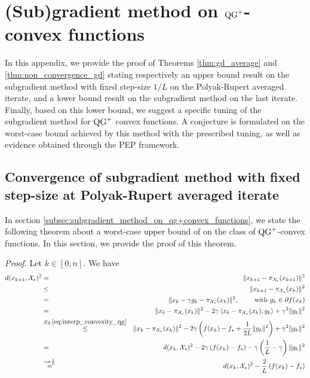 \section{\texorpdfstring{(Sub)gradient method on $\operatorname{QG}^+$-convex functions}{(Sub)-gradient method on QG+ convex functions}}
\label{apx:subgrad}

In this appendix, we provide the proof of Theorems \ref{thm:gd_average} and \ref{thm:non_convergence_gd} stating respectively an upper bound result on the subgradient method with fixed step-size $1 / L$ on the Polyak-Rupert averaged iterate, and a lower bound result on the subgradient method on the last iterate.
Finally, based on this lower bound, we suggest a specific tuning of the subgradient method for $\operatorname{QG}^+$ convex functions.
A conjecture is formulated on the worst-case bound achieved by this method with the prescribed tuning, as well as evidence obtained through the PEP framework.

\subsection{Convergence of subgradient method with fixed step-size at Polyak-Rupert averaged iterate}\label{apx:gd_proof_th1_upper_bound}

In section \ref{subsec:subgradient_method_on_qg+convex_functions}, we state the following theorem about a worst-case upper bound of  on the class of $\operatorname{QG}^+$-convex functions. In this section, we provide the proof of this theorem.

\convergenceofsubgradientmethodinaverage*

\noindent \textit{Proof.}
    Let $k \in [0, n]$. We have
    \begin{eqnarray*}
        d(x_{k+1}, \mathcal{X}_\star)^2 & = & \|x_{k+1} - \pi_{\mathcal{X}_\star}(x_{k+1})\|^2 \\
        & \leq & \|x_{k+1} - \pi_{\mathcal{X}_\star}(x_{k})\|^2 \\
        & = & \|x_k - \gamma g_k -  \pi_{\mathcal{X}_\star}(x_{k})\|^2, \qquad \text{ with } g_k \in \partial f(x_k) \\
        & = & \|x_k - \pi_{\mathcal{X}_\star}(x_{k})\|^2 - 2\gamma \left< x_k - \pi_{\mathcal{X}_\star}(x_{k}) , g_k \right> + \gamma^2 \|g_k\|^2 \\
        & \overset{Eq. \eqref{eq:interp_convexity_qg}}{\leq} & \|x_k - \pi_{\mathcal{X}_\star}(x_{k})\|^2 - 2\gamma \left(f(x_k) - f_\star + \frac{1}{2L}\|g_k\|^2\right) + \gamma^2 \|g_k\|^2 \\
        & = & d(x_k, \mathcal{X}_\star)^2 - 2\gamma \left(f(x_k) - f_\star \right) - \gamma \left( \frac{1}{L} - \gamma \right) \|g_k\|^2 \\
        & \overset{\gamma=\frac{1}{L}}{=} & d(x_k, \mathcal{X}_\star)^2 - \frac{2}{L} \left(f(x_k) - f_\star \right)
    \end{eqnarray*}
    
